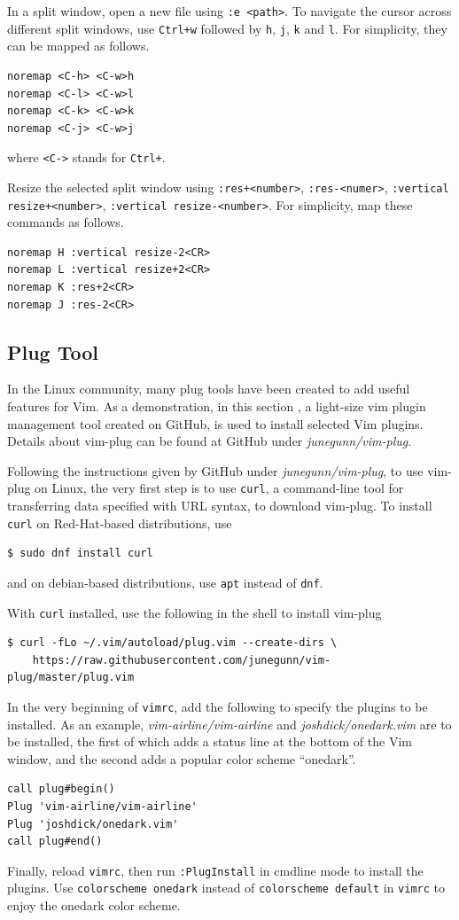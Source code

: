 In a split window, open a new file using \verb|:e <path>|. To navigate the cursor across different split windows, use \verb|Ctrl+w| followed by \verb|h|, \verb|j|, \verb|k| and \verb|l|. For simplicity, they can be mapped as follows.
\begin{lstlisting}
noremap <C-h> <C-w>h
noremap <C-l> <C-w>l
noremap <C-k> <C-w>k
noremap <C-j> <C-w>j
\end{lstlisting}
where \verb|<C->| stands for \verb|Ctrl+|.

Resize the selected split window using \verb|:res+<number>|, \verb|:res-<numer>|, \verb|:vertical resize+<number>|, \verb|:vertical resize-<number>|. For simplicity, map these commands as follows.
\begin{lstlisting}
noremap H :vertical resize-2<CR>
noremap L :vertical resize+2<CR>
noremap K :res+2<CR>
noremap J :res-2<CR>
\end{lstlisting}

\subsection{Plug Tool}

In the Linux community, many plug tools have been created to add useful features for Vim. As a demonstration, in this section , a light-size vim plugin management tool created on GitHub, is used to install selected Vim plugins. Details about vim-plug can be found at GitHub under \textit{junegunn/vim-plug}.

Following the instructions given by GitHub under \textit{junegunn/vim-plug}, to use vim-plug on Linux, the very first step is to use \verb|curl|, a command-line tool for transferring data specified with URL syntax, to download vim-plug. To install \verb|curl| on Red-Hat-based distributions, use
\begin{lstlisting}
$ sudo dnf install curl
\end{lstlisting}
and on debian-based distributions, use \verb|apt| instead of \verb|dnf|.

With \verb|curl| installed, use the following in the shell to install vim-plug
\begin{lstlisting}
$ curl -fLo ~/.vim/autoload/plug.vim --create-dirs \
    https://raw.githubusercontent.com/junegunn/vim-plug/master/plug.vim
\end{lstlisting}
In the very beginning of \verb|vimrc|, add the following to specify the plugins to be installed. As an example, \textit{vim-airline/vim-airline} and \textit{joshdick/onedark.vim} are to be installed, the first of which adds a status line at the bottom of the Vim window, and the second adds a popular color scheme ``onedark''.
\begin{lstlisting}
call plug#begin()
Plug 'vim-airline/vim-airline'
Plug 'joshdick/onedark.vim'
call plug#end()
\end{lstlisting}
Finally, reload \verb|vimrc|, then run \verb|:PlugInstall| in cmdline mode to install the plugins. Use \verb|colorscheme onedark| instead of \verb|colorscheme default| in \verb|vimrc| to enjoy the onedark color scheme.

